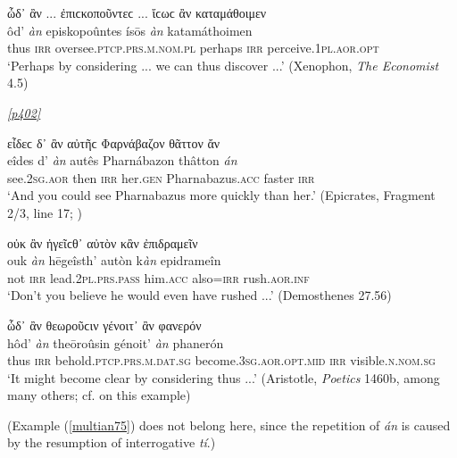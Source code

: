 \begin{exe}
\ex ὦδ᾽ ἂν ... ἐπιϲκοποῦντεϲ ... ἴϲωϲ ἂν καταμάθοιμεν\\
\gll ôd' \emph{àn} episkopoûntes ísōs \emph{àn} katamáthoimen\\
thus \textsc{irr} oversee.\textsc{ptcp.prs.m.nom.pl} perhaps \textsc{irr} perceive.\textsc{1pl.aor.opt}\\
\trans `Perhaps by considering ... we can thus discover ...' (Xenophon, \textit{The Economist} 4.5)
\label{multian71}
\end{exe}

\hyperlink{p402}{\emph{[p402]}} 

\begin{exe}
\ex εἶδεϲ δ᾽ ἂν αὐτῆϲ Φαρνάβαζον θᾶττον ἄν\\
\gll eîdes d' \emph{àn} autês Pharnábazon thâtton \emph{án}\\
see.\textsc{2sg.aor} then \textsc{irr} her.\textsc{gen} Pharnabazus.\textsc{acc} faster \textsc{irr}\\
\trans `And you could see Pharnabazus more quickly than her.' (Epicrates, Fragment 2/3, line 17; \citealp[283]{Kock1884})
\label{multian72}
\end{exe}

\begin{exe}
\ex οὐκ ἂν ἡγεῖϲθ᾽ αὐτὸν κἂν ἐπιδραμεῖν\\
\gll ouk \emph{àn} hēgeîsth' autòn k\emph{àn} epidrameîn\\
not \textsc{irr} lead.\textsc{2pl.prs.pass} him.\textsc{acc} also=\textsc{irr} rush.\textsc{aor.inf}\\
\trans `Don't you believe he would even have rushed ...' (Demosthenes 27.56)
\label{multian73}
\end{exe}

\begin{exe}
\ex ὧδ᾽ ἂν θεωροῦϲιν γένοιτ᾽ ἂν φανερόν\\
\gll hôd' \emph{àn} theōroûsin génoit' \emph{àn} phanerón\\
thus \textsc{irr} behold.\textsc{ptcp.prs.m.dat.sg} become.\textsc{3sg.aor.opt.mid} \textsc{irr} visible.\textsc{n.nom.sg}\\
\trans `It might become clear by considering thus ...' (Aristotle, \textit{Poetics} 1460b, among many others; cf. \citet[408, 438]{Vahlen1865} on this example)
\label{multian74}
\end{exe}

(Example (\ref{multian75}) does not belong here, since the repetition of \emph{án} is caused by the resumption of interrogative \textit{tí}.)

